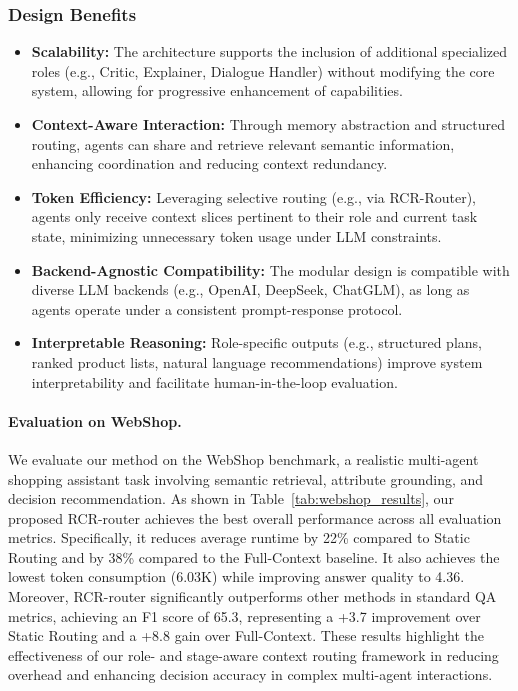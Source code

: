 \subsubsection*{Design Benefits}
\begin{itemize}
\item \textbf{Scalability:} The architecture supports the inclusion of additional specialized roles (e.g., Critic, Explainer, Dialogue Handler) without modifying the core system, allowing for progressive enhancement of capabilities.

\item \textbf{Context-Aware Interaction:} Through memory abstraction and structured routing, agents can share and retrieve relevant semantic information, enhancing coordination and reducing context redundancy.

\item \textbf{Token Efficiency:} Leveraging selective routing (e.g., via RCR-Router), agents only receive context slices pertinent to their role and current task state, minimizing unnecessary token usage under LLM constraints.

\item \textbf{Backend-Agnostic Compatibility:} The modular design is compatible with diverse LLM backends (e.g., OpenAI, DeepSeek, ChatGLM), as long as agents operate under a consistent prompt-response protocol.

\item \textbf{Interpretable Reasoning:} Role-specific outputs (e.g., structured plans, ranked product lists, natural language recommendations) improve system interpretability and facilitate human-in-the-loop evaluation.
\end{itemize}

\paragraph{Evaluation on WebShop.}
We evaluate our method on the WebShop benchmark, a realistic multi-agent shopping assistant task involving semantic retrieval, attribute grounding, and decision recommendation. As shown in Table~\ref{tab:webshop_results}, our proposed RCR-router achieves the best overall performance across all evaluation metrics. Specifically, it reduces average runtime by 22\% compared to Static Routing and by 38\% compared to the Full-Context baseline. It also achieves the lowest token consumption (6.03K) while improving answer quality to 4.36. Moreover, RCR-router significantly outperforms other methods in standard QA metrics, achieving an F1 score of 65.3, representing a +3.7 improvement over Static Routing and a +8.8 gain over Full-Context. These results highlight the effectiveness of our role- and stage-aware context routing framework in reducing overhead and enhancing decision accuracy in complex multi-agent interactions.

